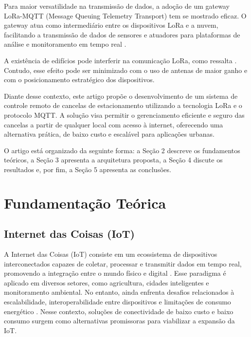 \documentclass[
article,			%
11pt,				%
twoside,			%
a4paper,			%
section=TITLE,		%
onecolumn,          %
english,			%
brazil,				%
sumario=tradicional
]{abntex2}
\begin{document}
Para maior versatilidade na transmissão de dados, a adoção de um gateway LoRa-MQTT (Message Queuing Telemetry Transport) tem se mostrado eficaz. O gateway atua como intermediário entre os dispositivos LoRa e a nuvem, facilitando a transmissão de dados de sensores e atuadores para plataformas de análise e monitoramento em tempo real \cite{Bhawiyuga2019}.

A existência de edifícios pode interferir na comunicação LoRa, como ressalta \cite{lima2023}. Contudo, esse efeito pode ser minimizado com o uso de antenas de maior ganho e com o posicionamento estratégico dos dispositivos.

Diante desse contexto, este artigo propõe o desenvolvimento de um sistema de controle remoto de cancelas de estacionamento utilizando a tecnologia LoRa e o protocolo MQTT. A solução visa permitir o gerenciamento eficiente e seguro das cancelas a partir de qualquer local com acesso à internet, oferecendo uma alternativa prática, de baixo custo e escalável para aplicações urbanas.

O artigo está organizado da seguinte forma: a Seção 2 descreve os fundamentos teóricos, a Seção 3 apresenta a arquitetura proposta, a Seção 4 discute os resultados e, por fim, a Seção 5 apresenta as conclusões.


\section{Fundamentação Teórica}

\subsection{Internet das Coisas (IoT)}
A Internet das Coisas (IoT) consiste em um ecossistema de dispositivos interconectados capazes de coletar, processar e transmitir dados em tempo real, promovendo a integração entre o mundo físico e digital \cite{lima2023}. Esse paradigma é aplicado em diversos setores, como agricultura, cidades inteligentes e monitoramento ambiental. No entanto, ainda enfrenta desafios relacionados à escalabilidade, interoperabilidade entre dispositivos e limitações de consumo energético \cite{huh2019}. Nesse contexto, soluções de conectividade de baixo custo e baixo consumo surgem como alternativas promissoras para viabilizar a expansão da IoT.
\end{document}
